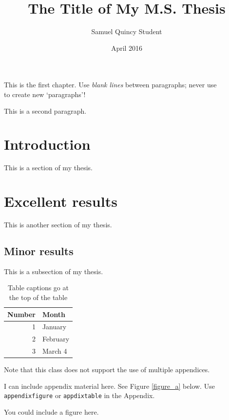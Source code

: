 \documentclass[ms-thesis]{ndsu-thesis}
\title{The Title of My M.S. Thesis}
\author{Samuel Quincy Student}
\date{April 2016}
\begin{document}


This is the first chapter. Use \textit{blank lines} between paragraphs; never use \texttt{\\} to create new `paragraphs'!

This is a second paragraph.

\section{Introduction}
This is a section of my thesis.



\section{Excellent results}
This is another section of my thesis.
\subsection{Minor results}
This is a subsection of my thesis.
\begin{table}[h]
\centering
\caption{Table captions go at the top of the table}
\begin{tabular}{rl}
Number & Month \\
\hline
1 & January \\
2 & February \\
3 & March
4
\end{tabular}
\end{table}

% 
% 


\appendix  %
Note that this class does not support the use of multiple appendices.

I can include appendix material here. See Figure \ref{figure_a} below. Use \texttt{appendixfigure} or \texttt{appdixtable} in the Appendix.

\begin{appendixfigure}
\centering
You could include a figure here.
\caption{Figure captions go at the bottom of the figure}
\label{figure_a}
\end{appendixfigure}
\end{document}
